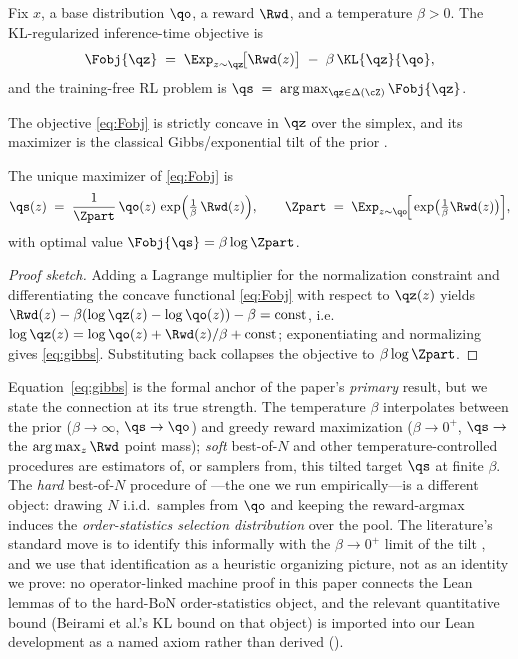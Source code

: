\begin{definition}
\label{def:objective}
Fix $x$, a base distribution $\qo$, a reward $\Rwd$, and a temperature $\beta > 0$. The KL-regularized inference-time objective is
\begin{equation}
\label{eq:Fobj}
\Fobj{\qz} \;=\; \Exp_{z \sim \qz}\!\big[\Rwd(z)\big] \;-\; \beta\,\KL{\qz}{\qo},
\end{equation}
and the training-free RL problem is $\qs \;=\; \arg\max_{\qz \in \Delta(\cZ)} \Fobj{\qz}$.
\end{definition}

The objective \eqref{eq:Fobj} is strictly concave in $\qz$ over the simplex, and its maximizer is the classical Gibbs/exponential tilt of the prior \citep{korbak2022kl}.

\begin{proposition}
\label{prop:gibbs}
The unique maximizer of \eqref{eq:Fobj} is
\begin{equation}
\label{eq:gibbs}
\qs(z) \;=\; \frac{1}{\Zpart}\,\qo(z)\,\exp\!\Big(\tfrac{1}{\beta}\,\Rwd(z)\Big),
\qquad
\Zpart \;=\; \Exp_{z \sim \qo}\!\Big[\exp\!\big(\tfrac{1}{\beta}\Rwd(z)\big)\Big],
\end{equation}
with optimal value $\Fobj{\qs} = \beta \log \Zpart$.
\end{proposition}

\begin{proof}[Proof sketch]
Adding a Lagrange multiplier for the normalization constraint and differentiating the concave functional \eqref{eq:Fobj} with respect to $\qz(z)$ yields $\Rwd(z) - \beta(\log \qz(z) - \log \qo(z)) - \beta = \text{const}$, i.e. $\log \qz(z) = \log \qo(z) + \Rwd(z)/\beta + \text{const}$; exponentiating and normalizing gives \eqref{eq:gibbs}. Substituting back collapses the objective to $\beta\log\Zpart$.
\end{proof}

Equation~\eqref{eq:gibbs} is the formal anchor of the paper's \emph{primary} result, but we state the connection at its true strength. The temperature $\beta$ interpolates between the prior ($\beta\to\infty$, $\qs\to\qo$) and greedy reward maximization ($\beta\to 0^+$, $\qs\to$ the $\arg\max_z \Rwd$ point mass); \emph{soft} best-of-$N$ and other temperature-controlled procedures \citep{beirami2024bon,verdun2025softbon,khalaf2025hedgetune} are estimators of, or samplers from, this tilted target $\qs$ at finite $\beta$. The \emph{hard} best-of-$N$ procedure of ---the one we run empirically---is a different object: drawing $N$ i.i.d.\ samples from $\qo$ and keeping the reward-argmax induces the \emph{order-statistics selection distribution} over the pool. The literature's standard move is to identify this informally with the $\beta\to 0^+$ limit of the tilt \citep{beirami2024bon}, and we use that identification as a heuristic organizing picture, not as an identity we prove: no operator-linked machine proof in this paper connects the Lean lemmas of  to the hard-BoN order-statistics object, and the relevant quantitative bound (Beirami et al.'s KL bound on that object) is imported into our Lean development as a named axiom rather than derived ().

